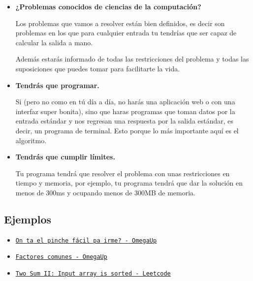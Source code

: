 \documentclass[12pt, fleqn]{report}                             %
\newcommand \Link[2] {\underline{\textCode{\href{#1}{#2}}}}       %
\theoremstyle{break}                                            %
\newcommand{\textCode}[1]  { \texttt{#1} }                      %
\begin{document}
            \begin{itemize}
                \item \textbf{¿Problemas conocidos de ciencias de la computación?}
                
                    Los problemas que vamos a resolver están bien definidos, es decir son problemas
                    en los que para cualquier entrada tu tendrías que ser capaz de calcular la salida
                    a mano.

                    Además estarás informado de todas las restricciones del problema y todas las 
                    suposiciones que puedes tomar para facilitarte la vida.

                \item \textbf{Tendrás que programar.}
                
                    Si (pero no como en tú día a día, no harás una aplicación web o con una interfaz
                    super bonita), sino que haras programas que toman datos por la entrada estándar
                    y nos regresan una respuesta por la salida estándar, es decir, un programa 
                    de terminal. Esto porque lo más importante aquí es el algoritmo.

                \item \textbf{Tendrás que cumplir límites.}
                
                    Tu programa tendrá que resolver el problema con unas restricciones
                    en tiempo y memoria, por ejemplo, tu programa tendrá que dar la
                    solución en menos de 300ms y ocupando menos de 300MB de memoria.

            \end{itemize}

            \subsection{Ejemplos}

                \begin{itemize}
                    \item 
                        \Link{https://omegaup.com/arena/problem/On-ta-el-pinche-facil-pa-irme}
                        {On ta el pinche fácil pa irme? -  OmegaUp}
                    \item 
                        \Link{https://omegaup.com/arena/problem/factorescomunes}
                        {Factores comunes - OmegaUp}
                    \item 
                        \Link{https://leetcode.com/problems/two-sum-ii-input-array-is-sorted/}
                        {Two Sum II: Input array is sorted - Leetcode}
                \end{itemize}
\end{document}
